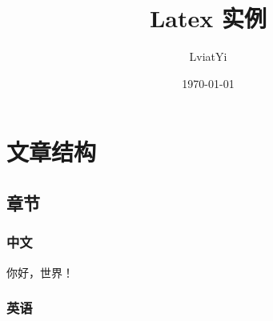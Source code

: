 \documentclass[UTF8]{ctexart}
\title{Latex 实例}
\author{LviatYi}
\date{\today}
\begin{document}

\maketitle

\tableofcontents

\section{文章结构}

\subsection{章节}

\subsubsection{中文}

你好，世界！

\subsubsection{英语}
\end{document}
